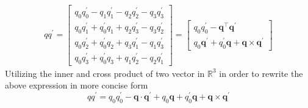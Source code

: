 \begin{equation}
\begin{aligned}
q q^{\prime}=\left[\begin{array}{l}
q_{0} q_{0}^{\prime}-q_{1} q_{1}^{\prime}-q_{2} q_{2}^{\prime}-q_{3} q_{3}^{\prime} \\
q_{0} q_{1}^{\prime}+q_{0}^{\prime} q_{1}+q_{2} q_{3}^{\prime}-q_{3} q_{2}^{\prime} \\
q_{0} q_{2}^{\prime}+q_{0}^{\prime} q_{2}+q_{3} q_{1}^{\prime}-q_{1} q_{3}^{\prime} \\
q_{0} q_{3}^{\prime}+q_{0}^{\prime} q_{3}+q_{1} q_{2}^{\prime}-q_{2} q_{1}^{\prime}
\end{array}\right]=\left[\begin{array}{c}
q_{0} q_{0}^{\prime}-\boldsymbol{q}^{\top} \boldsymbol{q}^{\prime} \\
q_{0} \boldsymbol{q}^{\prime}+q_{0}^{\prime} \boldsymbol{q}+\boldsymbol{q} \times \boldsymbol{q}^{\prime}
\end{array}\right]
\end{aligned}
\end{equation}
Utilizing the inner and cross product of two vector in $\mathbb{R}^3$ in order to rewrite the above expression in more concise form
\begin{equation}
q q^{\prime}=q_{0} q_{0}^{\prime}-\boldsymbol{q} \cdot \boldsymbol{q}^{\prime}+q_{0} \boldsymbol{q}+q_{0}^{\prime} \boldsymbol{q}+\boldsymbol{q} \times \boldsymbol{q}^{\prime}
\end{equation}

